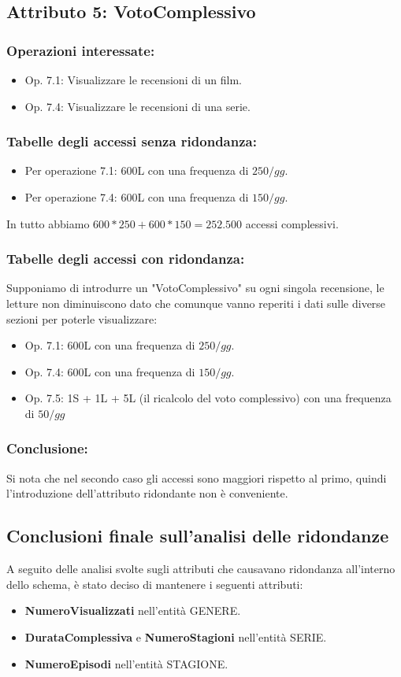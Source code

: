 \documentclass[a4paper,12pt]{report}
\begin{document}
\subsection{Attributo 5: VotoComplessivo}
\subsubsection{Operazioni interessate:}
\begin{itemize}
	\item Op. 7.1: Visualizzare le recensioni di un film.
	\item Op. 7.4: Visualizzare le recensioni di una serie.
\end{itemize}
\subsubsection{Tabelle degli accessi senza ridondanza:}
\begin{itemize}
	\item Per operazione 7.1: 600L con una frequenza di $250/gg$.
	\item Per operazione 7.4: 600L con una frequenza di $150/gg$.
\end{itemize}
In tutto abbiamo $600 * 250 + 600 * 150 = 252.500$ accessi complessivi.
\subsubsection{Tabelle degli accessi con ridondanza:}
Supponiamo di introdurre un "VotoComplessivo" su ogni singola recensione, le letture non diminuiscono dato che comunque vanno reperiti i dati sulle diverse sezioni per poterle visualizzare:
\begin{itemize}
	\item Op. 7.1: 600L con una frequenza di $250/gg$.
	\item Op. 7.4: 600L con una frequenza di $150/gg$.
	\item Op. 7.5: 1S + 1L + 5L (il ricalcolo del voto complessivo) con una frequenza di $50/gg$
\end{itemize}
\subsubsection{Conclusione:}
Si nota che nel secondo caso gli accessi sono maggiori rispetto al primo, quindi l'introduzione dell'attributo ridondante non è conveniente.

\subsection{Conclusioni finale sull'analisi delle ridondanze}
A seguito delle analisi svolte sugli attributi che causavano ridondanza all'interno dello schema, è stato deciso di mantenere i seguenti attributi:
\begin{itemize}
	\item \textbf{NumeroVisualizzati} nell'entità GENERE.
	\item \textbf{DurataComplessiva} e \textbf{NumeroStagioni} nell'entità SERIE.
	\item \textbf{NumeroEpisodi} nell'entità STAGIONE.
\end{itemize}
\end{document}
